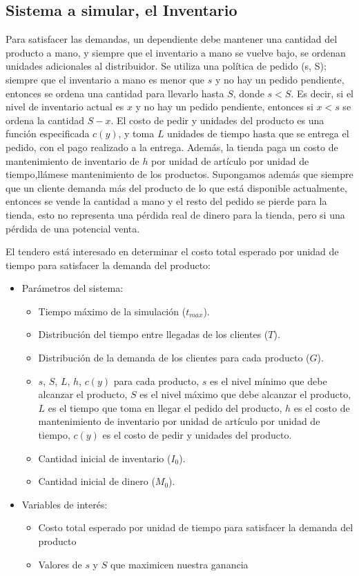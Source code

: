 \documentclass{article}
\begin{document}
\subsection*{Sistema a simular, el Inventario}


Para satisfacer las demandas, un dependiente debe mantener una cantidad del producto a mano, y siempre que el inventario a
mano se vuelve bajo, se ordenan unidades adicionales al distribuidor. Se utiliza una política de pedido (s, S); siempre que el inventario a mano es menor que $s$ y no hay un pedido pendiente, entonces se ordena una cantidad para llevarlo hasta $S$, donde $s<S$. Es decir, si el nivel de inventario actual es $x$ y no hay un
pedido pendiente, entonces si $x<s$ se ordena la cantidad $S-x$.
El costo de pedir y unidades del producto es una función especificada $c(y)$, y toma $L$ unidades de tiempo hasta que se
entrega el pedido, con el pago realizado a la entrega. Además, la tienda paga un costo de mantenimiento de inventario de
$h$ por unidad de artículo por unidad de tiempo,llámese mantenimiento de los productos.
Supongamos además que siempre que un cliente demanda más del producto de lo que está disponible actualmente, entonces se
vende la cantidad a mano y el resto del pedido se pierde para la tienda, esto no representa una pérdida real de dinero para la tienda, pero si una pérdida de una potencial venta.

El tendero está interesado en determinar el costo total esperado por unidad de tiempo para satisfacer la demanda del
producto:


\begin{itemize}

    \item Parámetros del sistema:
    \begin{itemize}
        \item  Tiempo máximo de la simulación ($t_{max}$).
        \item  Distribución del tiempo entre llegadas de los clientes ($T$).
        \item  Distribución de la demanda de los clientes para cada producto ($G$).
        \item  $s$, $S$, $L$, $h$, $c(y)$ para cada producto, $s$ es el nivel mínimo que debe alcanzar el producto, $S$ es el nivel máximo que debe alcanzar el producto, $L$ es el tiempo que toma en llegar el pedido del producto, $h$ es el costo de mantenimiento de inventario por unidad de artículo por unidad de tiempo, $c(y)$ es el costo de pedir y unidades del producto.
        \item Cantidad inicial de inventario ($I_0$).
        \item Cantidad inicial de dinero ($M_0$).
     \end{itemize}


    \item Variables de interés:
    \begin{itemize}
        \item Costo total esperado por unidad de tiempo para satisfacer la demanda del producto
        \item Valores de $s$ y $S$ que maximicen nuestra ganancia
    \end{itemize}
\end{itemize}
\end{document}
